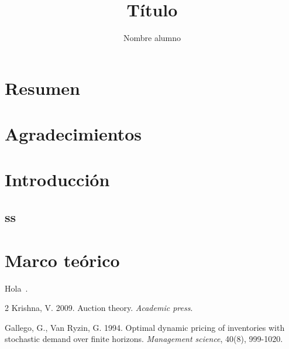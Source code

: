 \documentclass[a4paper,openany]{memoir}
\title{Título}
\subtitle{}
\author{Nombre alumno\hfill\the\year}
\begin{document}
    \frontmatter        %

    \mnfrontpage

\chapter{Resumen}


\chapter{Agradecimientos}

    \cleartorecto
    \tableofcontents    %
    \cleartorecto
    \mainmatter         %






\chapter{Introducción}

\section{ss}

\chapter{Marco teórico}
Hola~\cite{auction}.

    \backmatter         %




\begin{thebibliography}{2}
	 Krishna, V. 2009.   Auction theory. \textit{Academic press}.
	
	 Gallego, G.,  Van Ryzin, G. 1994. Optimal dynamic pricing of inventories with stochastic demand over finite horizons. \textit{Management science}, 40(8), 999-1020.

\end{thebibliography}
\end{document}

